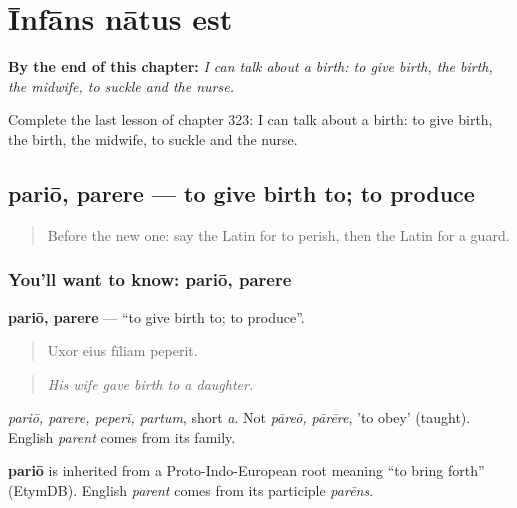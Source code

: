 
\chapter{Īnfāns nātus est}
\label{ch:la-infans-natus-est}

\begin{chapteropening}
\textbf{By the end of this chapter:} \emph{I can talk about a birth: to give birth, the birth, the midwife, to suckle and the nurse.}

Complete the last lesson of chapter 323: I can talk about a birth: to give birth, the birth, the midwife, to suckle and the nurse.
\end{chapteropening}

\section[pariō, parere]{pariō, parere — to give birth to; to produce}

\label{lesson:LA-C323-pario}



\begin{quote}
Before the new one: say the Latin for to perish, then the Latin for a guard.
\end{quote}

\subsection*{You'll want to know: pariō, parere}
\textbf{pariō, parere} — \textquotedblleft{}to give birth to; to produce\textquotedblright{}.

\begin{quote}
Uxor eius fīliam peperit.
\end{quote}

\begin{quote}
\emph{His wife gave birth to a daughter.}
\end{quote}

\emph{pariō, parere, peperī, partum}, short \emph{a}. Not \emph{pāreō, pārēre}, 'to obey' (taught). English \emph{parent} comes from its family.

\begin{cousinweb}
\textbf{pariō} is inherited from a Proto-Indo-European root meaning \textquotedblleft{}to bring forth\textquotedblright{} (EtymDB). English \emph{parent} comes from its participle \emph{parēns}.
\end{cousinweb}

